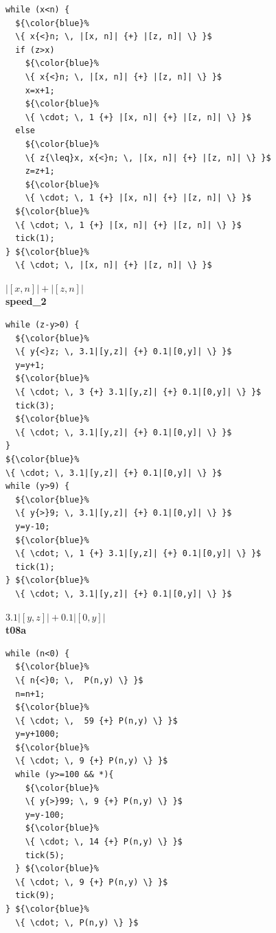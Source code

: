 \documentclass{sigplanconf}
\begin{document}
\begin{figure}
\begin{minipage}[b]{\progwidth}
\begin{center}
\begin{lstlisting}
while (x<n) {
  ${\color{blue}%
  \{ x{<}n; \, |[x, n]| {+} |[z, n]| \} }$
  if (z>x)
    ${\color{blue}%
    \{ x{<}n; \, |[x, n]| {+} |[z, n]| \} }$
    x=x+1;
    ${\color{blue}%
    \{ \cdot; \, 1 {+} |[x, n]| {+} |[z, n]| \} }$
  else
    ${\color{blue}%
    \{ z{\leq}x, x{<}n; \, |[x, n]| {+} |[z, n]| \} }$
    z=z+1;
    ${\color{blue}%
    \{ \cdot; \, 1 {+} |[x, n]| {+} |[z, n]| \} }$
  ${\color{blue}%
  \{ \cdot; \, 1 {+} |[x, n]| {+} |[z, n]| \} }$
  tick(1);
} ${\color{blue}%
  \{ \cdot; \, |[x, n]| {+} |[z, n]| \} }$
   \end{lstlisting}
\vspace{-2.5ex}
$|[x, n]| + |[z, n]|$
\\[.4\baselineskip]
      {\bf speed\_2}
    \end{center}
  \end{minipage}
%
\hfill
%
  \begin{minipage}[b]{\progwidth}
    \begin{center}
   \begin{lstlisting}
while (z-y>0) {
  ${\color{blue}%
  \{ y{<}z; \, 3.1|[y,z]| {+} 0.1|[0,y]| \} }$
  y=y+1;
  ${\color{blue}%
  \{ \cdot; \, 3 {+} 3.1|[y,z]| {+} 0.1|[0,y]| \} }$
  tick(3);
  ${\color{blue}%
  \{ \cdot; \, 3.1|[y,z]| {+} 0.1|[0,y]| \} }$
}
${\color{blue}%
\{ \cdot; \, 3.1|[y,z]| {+} 0.1|[0,y]| \} }$
while (y>9) {
  ${\color{blue}%
  \{ y{>}9; \, 3.1|[y,z]| {+} 0.1|[0,y]| \} }$
  y=y-10;
  ${\color{blue}%
  \{ \cdot; \, 1 {+} 3.1|[y,z]| {+} 0.1|[0,y]| \} }$
  tick(1);
} ${\color{blue}%
  \{ \cdot; \, 3.1|[y,z]| {+} 0.1|[0,y]| \} }$
   \end{lstlisting}
\vspace{-2.5ex}
$3.1|[y,z]| + 0.1|[0,y]|$
\\[.4\baselineskip]
      {\bf t08a}
    \end{center}
  \end{minipage}
%
\hfill
%
%
%
  \begin{minipage}[b]{\progwidth}
    \begin{center}
   \begin{lstlisting}
while (n<0) {
  ${\color{blue}%
  \{ n{<}0; \,  P(n,y) \} }$
  n=n+1;
  ${\color{blue}%
  \{ \cdot; \,  59 {+} P(n,y) \} }$
  y=y+1000;
  ${\color{blue}%
  \{ \cdot; \, 9 {+} P(n,y) \} }$
  while (y>=100 && *){
    ${\color{blue}%
    \{ y{>}99; \, 9 {+} P(n,y) \} }$
    y=y-100;
    ${\color{blue}%
    \{ \cdot; \, 14 {+} P(n,y) \} }$
    tick(5);
  } ${\color{blue}%
  \{ \cdot; \, 9 {+} P(n,y) \} }$
  tick(9);
} ${\color{blue}%
  \{ \cdot; \, P(n,y) \} }$

\end{lstlisting}
\end{center}
\end{minipage}
\end{figure}
\end{document}
